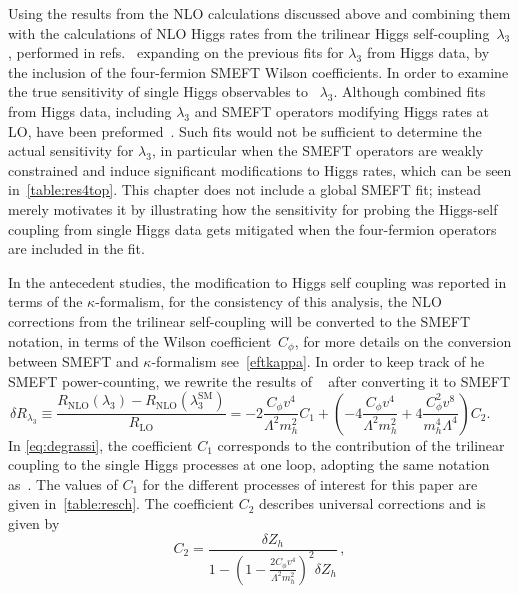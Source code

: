 	\par Using the results from the  NLO calculations discussed above and combining them with the calculations of NLO Higgs rates from the trilinear Higgs self-coupling~$\lambda_3$, performed in refs.~\cite{Gorbahn:2016uoy, Degrassi:2016wml, Bizon:2016wgr, Maltoni:2017ims, Degrassi:2021uik}  expanding  on the previous fits for $\lambda_3$ from Higgs data, by the inclusion of the four-fermion SMEFT Wilson coefficients. In order to examine the true sensitivity of single Higgs observables to ~$\lambda_3$.  
	Although combined fits from Higgs data, including $\lambda_3$ and SMEFT operators modifying Higgs rates at LO, have been preformed~\cite{DiVita:2017eyz}. Such fits would not be sufficient to determine the actual sensitivity for $\lambda_3$, in particular when the SMEFT operators are weakly constrained and induce significant modifications to Higgs rates, which can be seen in~\autoref{table:res4top}. This chapter does not include a global SMEFT fit; instead merely motivates it by illustrating how the sensitivity for probing the Higgs-self coupling from single Higgs data gets mitigated when the four-fermion operators are included in the fit.
	\par In the antecedent studies, the modification to Higgs self coupling was reported in terms of the $\kappa$-formalism, for the consistency of this analysis, the NLO corrections from the trilinear self-coupling will be converted to the SMEFT notation, in terms of the Wilson coefficient~$C_\phi$, for more details on the conversion between SMEFT and $\kappa$-formalism see~\autoref{eftkappa}. In order to keep track of he SMEFT power-counting,  we rewrite the results of ~\cite{Degrassi:2016wml} after converting it to SMEFT 
	\begin{equation}
		\delta R_{\lambda_3}\equiv\frac{R_\mathrm{ NLO}(\lambda_3)-R_\mathrm{ NLO}(\lambda_3^\mathrm{{SM}})}{R_\mathrm{ LO}}=-2\frac{C_{\phi}v^4}{\Lambda^2 m_h^2}C_1 + \left(-4\frac{C_{\phi}v^4}{\Lambda^2 m_h^2}+4\frac{C_{\phi}^2 v^8}{m_h^4\Lambda^4}\right) C_2 . \;\;\;\;\;
		\label{eq:degrassi}
	\end{equation}
	In \eqref{eq:degrassi}, the coefficient $C_1$ corresponds to the contribution of the trilinear coupling to the single Higgs processes at one loop, adopting the same notation as~\cite{Degrassi:2016wml}. The values of $C_1$ for the different processes of interest for this paper are given in~\autoref{table:resch}. The coefficient $C_2$ describes universal corrections and is given by
	\begin{equation}
		C_2=\frac{\delta Z_h}{1-\left(1-\frac{2 C_\phi v^4}{\Lambda^2 m_h^2}\right)^2 \delta Z_h}\,, \label{eq:C2}
	\end{equation}
